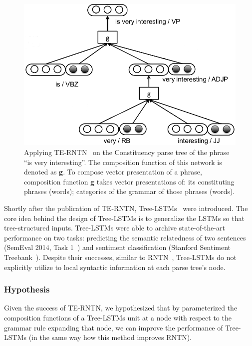 \begin{figure}[H]
    \centering
    \includegraphics[scale=0.4]{figure/example-compose-tag}
    \caption[Applying TE-RNTN on the phrase ``is very interesting'']{Applying TE-RNTN~\cite{tag-embedding-rnn} on the Constituency parse tree of the phrase ``is very interesting''.
    The composition function of this network is denoted as \textbf{g}.
    To compose vector presentation of a phrase, composition function \textbf{g} takes vector presentations of: its constituting phrases (words); categories of the grammar of those phrases (words).}
    \label{fig:example-compose-tag}
\end{figure}

Shortly after the publication of TE-RNTN, Tree-LSTMs~\cite{treeLSTM} were introduced.
The core idea behind the design of Tree-LSTMs is to generalize the LSTMs so that tree-structured inputs.
Tree-LSTMs were able to archive state-of-the-art performance on two tasks: predicting the semantic relatedness of two sentences (SemEval 2014, Task 1~\cite{SemeEvalTask1}) and sentiment classification (Stanford Sentiment Treebank~\cite{socher2013recursive}).
Despite their successes, similar to RNTN~\cite{socher2013recursive}, Tree-LSTMs do not explicitly utilize to local syntactic information at each parse tree's node.

\subsubsection{Hypothesis}
Given the success of TE-RNTN, we hypothesized that by parameterized the composition functions of a Tree-LSTMs unit at a node with respect to the grammar rule expanding that node, we can improve the performance of Tree-LSTMs (in the same way how this method improves RNTN).

